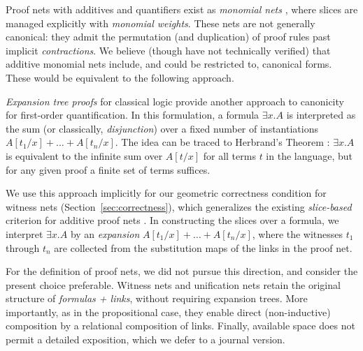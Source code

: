 \documentclass[UKenglish]{lipics-v2016}
\theoremstyle{plain}
\newcommand\+{+}
\renewcommand\*{\times}
\newcommand\dual[1]{\overline{#1}}
\newcommand\seq[2]{{\vdash}#1,#2}
\begin{document}
Proof nets with additives and quantifiers exist as \emph{monomial nets} \cite{Girard-1996}, where slices are managed explicitly with \emph{monomial weights}. These nets are not generally canonical: they admit the permutation (and duplication) of proof rules past implicit \emph{contractions}. We believe (though have not technically verified) that additive monomial nets include, and could be restricted to, canonical forms. These would be equivalent to the following approach.

\emph{Expansion tree proofs} for classical logic \cite{Miller-1987,Heijltjes-2010} provide another approach to canonicity for first-order quantification. In this formulation, a formula $\exists x.A$ is interpreted as the sum (or classically, \emph{disjunction}) over a fixed number of instantiations $A[t_1/x]\+\dots\+A[t_n/x]$. The idea can be traced to Herbrand's Theorem \cite{Herbrand-1930}: $\exists x.A$ is equivalent to the infinite sum over $A[t/x]$ for all terms $t$ in the language, but for any given proof a finite set of terms suffices.

We use this approach implicitly for our geometric correctness condition for witness nets (Section~\ref{sec:correctness}), which generalizes the existing \emph{slice-based} criterion for additive proof nets \cite{Hughes-vanGlabbeek-2005}. In constructing the slices over a formula, we interpret $\exists x.A$ by an \emph{expansion} $A[t_1/x]\+\dots\+A[t_n/x]$, where the witnesses $t_1$ through $t_n$ are collected from the substitution maps of the links in the proof net.

For the definition of proof nets, we did not pursue this direction, and consider the present choice preferable. Witness nets and unification nets retain the original structure of \emph{formulas + links}, without requiring expansion trees. More importantly, as in the propositional case, they enable direct (non-inductive) composition by a relational composition of links. Finally, available space does not permit a detailed exposition, which we defer to a journal version.





\end{document}
